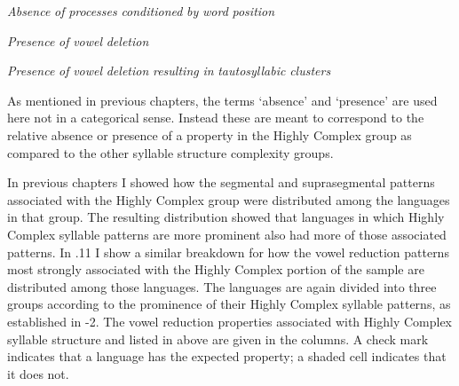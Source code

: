 \textit{Absence} \textit{of} \textit{processes} \textit{conditioned} \textit{by} \textit{word} \textit{position}

\textit{Presence} \textit{of} \textit{vowel} \textit{deletion}

\textit{Presence} \textit{of} \textit{vowel} \textit{deletion} \textit{resulting} \textit{in} \textit{tautosyllabic} \textit{clusters}

\z

  As mentioned in previous chapters, the terms ‘absence’ and ‘presence’ are used here not in a categorical sense. Instead these are meant to correspond to the relative absence or presence of a property in the Highly Complex group as compared to the other syllable structure complexity groups.

  In previous chapters I showed how the segmental and suprasegmental patterns associated with the Highly Complex group were distributed among the languages in that group. The resulting distribution showed that languages in which Highly Complex syllable patterns are more prominent also had more of those associated patterns. In .11 I show a similar breakdown for how the vowel reduction patterns most strongly associated with the Highly Complex portion of the sample are distributed among those languages. The languages are again divided into three groups according to the prominence of their Highly Complex syllable patterns, as established in -2. The vowel reduction properties associated with Highly Complex syllable structure and listed in  above are given in the columns. A check mark indicates that a language has the expected property; a shaded cell indicates that it does not. 


